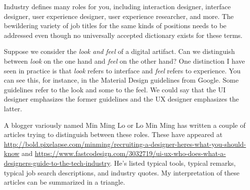 \hypertarget{background-radiation}{%
\label{background-radiation}}

\hypertarget{roles}{%
\label{roles}}

Industry defines many roles for you, including interaction designer,
interface designer, user experience designer, user experience
researcher, and more. The bewildering variety of job titles for the same
kinds of positions needs to be addressed even though no universally
accepted dictionary exists for these terms.

Suppose we consider the \emph{look and feel} of a digital artifact. Can
we distinguish between \emph{look} on the one hand and \emph{feel} on
the other hand? One distinction I have seen in practice is that
\emph{look} refers to interface and \emph{feel} refers to experience.
You can see this, for instance, in the Material Design guidelines from
Google. Some guidelines refer to the look and some to the feel. We could
say that the UI designer emphasizes the former guidelines and the UX
designer emphasizes the latter.

A blogger variously named Min Ming Lo or Lo Min Ming has written a
couple of articles trying to distinguish between these roles. These have
appeared at
\url{http://bold.pixelapse.com/minming/recruiting-a-designer-heres-what-you-should-know}
and
\url{https://www.fastcodesign.com/3032719/ui-ux-who-does-what-a-designers-guide-to-the-tech-industry}.
He's listed typical tools, typical remarks, typical job search
descriptions, and industry quotes. My interpretation of these articles
can be summarized in a triangle.

\begin{center}
\end{center}

